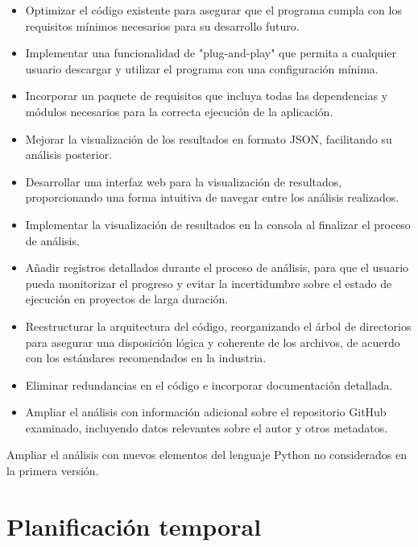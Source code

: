 \documentclass[a4paper, 12pt]{book}
\begin{document}
\begin{itemize} 
    \item Optimizar el código existente para asegurar que el programa cumpla con los requisitos mínimos necesarios para su desarrollo futuro. 
    \item Implementar una funcionalidad de "plug-and-play" que permita a cualquier usuario descargar y utilizar el programa con una configuración mínima. 
    \item Incorporar un paquete de requisitos que incluya todas las dependencias y módulos necesarios para la correcta ejecución de la aplicación. 
    \item Mejorar la visualización de los resultados en formato JSON, facilitando su análisis posterior. 
    \item Desarrollar una interfaz web para la visualización de resultados, proporcionando una forma intuitiva de navegar entre los análisis realizados. 
    \item Implementar la visualización de resultados en la consola al finalizar el proceso de análisis. 
    \item Añadir registros detallados durante el proceso de análisis, para que el usuario pueda monitorizar el progreso y evitar la incertidumbre sobre el estado de ejecución en proyectos de larga duración. 
    \item  Reestructurar la arquitectura del código, reorganizando el árbol de directorios para asegurar una disposición lógica y coherente de los archivos, de acuerdo con los estándares recomendados en la industria. 
    \item Eliminar redundancias en el código e incorporar documentación detallada. 
    \item Ampliar el análisis con información adicional sobre el repositorio GitHub examinado, incluyendo datos relevantes sobre el autor y otros metadatos. \end{itemize}
    \item Ampliar el análisis con nuevos elementos del lenguaje Python no considerados en la primera versión.

\section{Planificación temporal}
\label{sec:planificacion-temporal}

\end{document}
